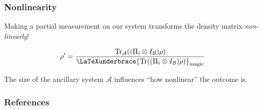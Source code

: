 \documentclass{beamer}
\begin{document}
\begin{frame}
  \frametitle{Nonlinearity}

  Making a partial measurement on our system transforms the density matrix
  \emph{non-linearly}!

  \[ \rho' = \frac{\Tr_{\mathcal{A}}((\Pi_i\otimes I_{\mathcal{B}}) \rho)}
    {\LaTeXunderbrace{ \Tr((\Pi_i\otimes I_{\mathcal{B}})\rho) }_{\text{magic}}}\]

  The size of the ancillary system $\mathcal{A}$ influences ``how nonlinear''
  the outcome is.

\end{frame}

\begin{frame}[allowframebreaks]
  \frametitle{References}
  \printbibliography
\end{frame}
\end{document}
